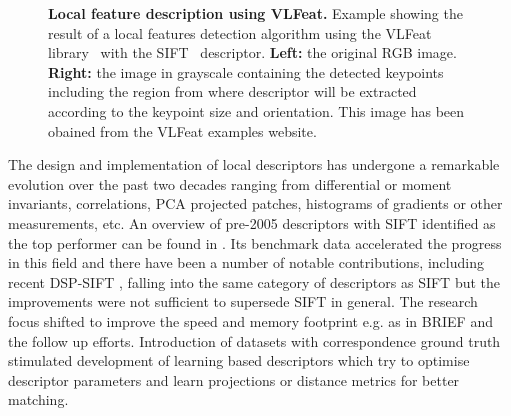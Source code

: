 \begin{figure}
    \centering
    \qquad
    \caption[Local feature description using VLFeat]{\textbf{Local feature description using VLFeat.} Example showing the result of a local features detection algorithm using the VLFeat library~\cite{vedaldi08vlfeat} with the SIFT~\cite{SIFT} descriptor. \textbf{Left:} the original RGB image. \textbf{Right:} the image in grayscale containing the detected keypoints including the region from where descriptor will be extracted according to the keypoint size and orientation. This image has been obained from the VLFeat examples website.}
    \label{tfeat_fig:feature_description_example}
\end{figure}

The design and implementation of local descriptors has undergone a
remarkable evolution over the past two decades ranging from
differential or moment invariants, correlations, PCA projected patches, histograms of
gradients or other measurements, etc. An
overview of  pre-2005 descriptors with SIFT
\cite{Lowe:2004:DIF:993451.996342} identified as the top performer can
be found in \cite{schmid2003performance}. 
Its benchmark data accelerated the progress in this field and there
have been a number of notable contributions, including recent DSP-SIFT
\cite{DBLP:journals/corr/DongS14}, falling into the same category of
descriptors as SIFT but the improvements were not sufficient to
supersede SIFT in general. The research focus shifted to
improve the speed and memory footprint e.g. as in BRIEF
\cite{Calonder:2010:BBR:1888089.1888148} and the follow up efforts.
Introduction of datasets with correspondence ground truth \cite{WHB09}
stimulated development of learning based descriptors which try to
optimise descriptor parameters and learn projections or distance
metrics \cite{BHW10,simonyan2014learning} for better matching. 

